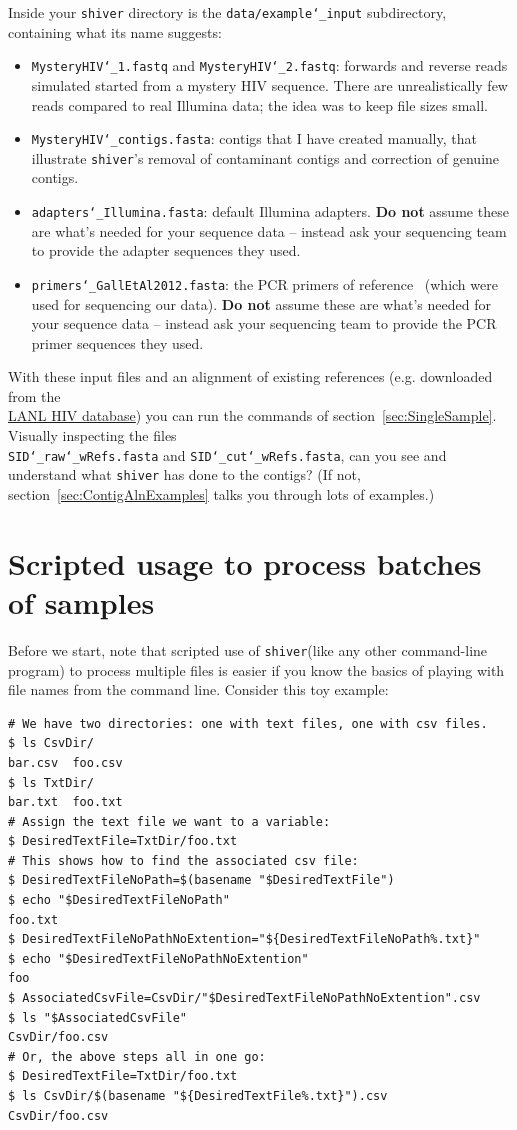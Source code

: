 \documentclass{article}
\newcommand{\shiv}{\c{shiver}\xspace}
\let\c\texttt
\newcommand{\www}{\color{blue} \underline}
\begin{document}
Inside your \shiv directory is the \c{data/example\char`_input} subdirectory, containing what its name suggests:
\begin{itemize}
\item \c{MysteryHIV\char`_1.fastq} and \c{MysteryHIV\char`_2.fastq}: forwards and reverse reads simulated started from a mystery HIV sequence.
There are unrealistically few reads compared to real Illumina data; the idea was to keep file sizes small.
\item \c{MysteryHIV\char`_contigs.fasta}: contigs that I have created manually, that illustrate \shiv's removal of contaminant contigs and correction of genuine contigs.
\item \c{adapters\char`_Illumina.fasta}: default Illumina adapters.
{\bf Do not} assume these are what's needed for your sequence data -- instead ask your sequencing team to provide the adapter sequences they used.
\item \c{primers\char`_GallEtAl2012.fasta}: the PCR primers of reference~\cite{Gall01122012} (which were used for sequencing our data).
{\bf Do not} assume these are what's needed for your sequence data -- instead ask your sequencing team to provide the PCR primer sequences they used.
\end{itemize}
With these input files and an alignment of existing references (e.g. downloaded from the \\\href{http://www.hiv.lanl.gov/content/sequence/NEWALIGN/align.html}{\www{LANL HIV database}}) you can run the commands of section~\ref{sec:SingleSample}.
Visually inspecting the files \\\c{SID\char`_raw\char`_wRefs.fasta} and \c{SID\char`_cut\char`_wRefs.fasta}, can you see and understand what \shiv has done to the contigs?
(If not, section~\ref{sec:ContigAlnExamples} talks you through lots of examples.)


\section{Scripted usage to process batches of samples} \label{sec:scripting}
Before we start, note that scripted use of \shiv (like any other command-line program) to process multiple files is easier if you know the basics of playing with file names from the command line.
Consider this toy example:
\begin{Verbatim}[samepage=true]
# We have two directories: one with text files, one with csv files.
$ ls CsvDir/
bar.csv  foo.csv
$ ls TxtDir/
bar.txt  foo.txt
# Assign the text file we want to a variable:
$ DesiredTextFile=TxtDir/foo.txt
# This shows how to find the associated csv file:
$ DesiredTextFileNoPath=$(basename "$DesiredTextFile")
$ echo "$DesiredTextFileNoPath"
foo.txt
$ DesiredTextFileNoPathNoExtention="${DesiredTextFileNoPath%.txt}"
$ echo "$DesiredTextFileNoPathNoExtention"
foo
$ AssociatedCsvFile=CsvDir/"$DesiredTextFileNoPathNoExtention".csv
$ ls "$AssociatedCsvFile"
CsvDir/foo.csv
# Or, the above steps all in one go:
$ DesiredTextFile=TxtDir/foo.txt
$ ls CsvDir/$(basename "${DesiredTextFile%.txt}").csv
CsvDir/foo.csv
\end{Verbatim}
\end{document}
